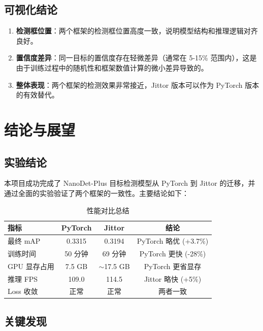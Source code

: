 \documentclass[12pt,a4paper]{article}
\begin{document}
\subsection{可视化结论}

\begin{enumerate}
    \item \textbf{检测框位置}：两个框架的检测框位置高度一致，说明模型结构和推理逻辑对齐良好。
    \item \textbf{置信度差异}：同一目标的置信度存在轻微差异（通常在 5-15\% 范围内），这是由于训练过程中的随机性和框架数值计算的微小差异导致的。
    \item \textbf{整体表现}：两个框架的检测效果非常接近，Jittor 版本可以作为 PyTorch 版本的有效替代。
\end{enumerate}

\section{结论与展望}

\subsection{实验结论}

本项目成功完成了 NanoDet-Plus 目标检测模型从 PyTorch 到 Jittor 的迁移，并通过全面的实验验证了两个框架的一致性。主要结论如下：

\begin{table}[H]
\centering
\caption{性能对比总结}
\begin{tabular}{lccc}
\toprule
\textbf{指标} & \textbf{PyTorch} & \textbf{Jittor} & \textbf{结论} \\
\midrule
最终 mAP & 0.3315 & 0.3194 & PyTorch 略优 (+3.7\%) \\
训练时间 & 50 分钟 & 69 分钟 & PyTorch 更快 (-28\%) \\
GPU 显存占用 & 7.5 GB & $\sim$17.5 GB & PyTorch 更省显存 \\
推理 FPS & 109.0 & 114.5 & Jittor 略快 (+5\%) \\
Loss 收敛 & 正常 & 正常 & 两者一致 \\
\bottomrule
\end{tabular}
\end{table}

\subsection{关键发现}
\end{document}
